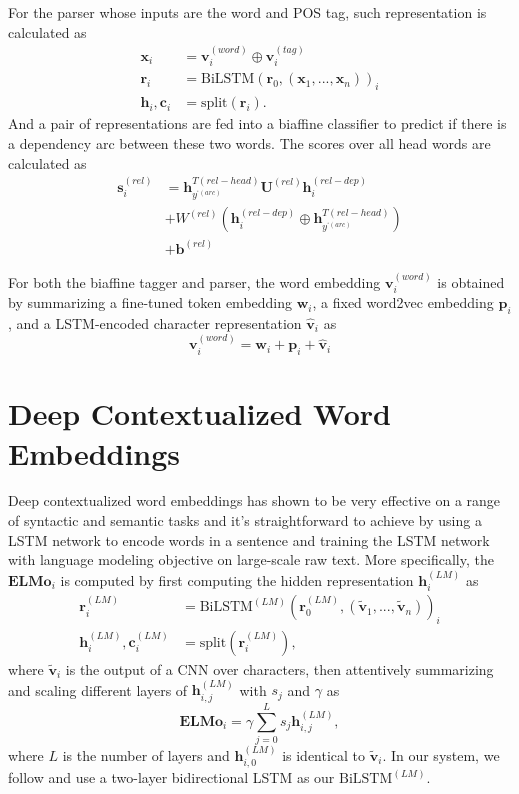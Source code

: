 \documentclass[11pt,a4paper]{article}
\begin{document}
For the parser whose inputs are the word and POS tag,
such representation is calculated as
\begin{align*}
\mathbf{x}_i & =  \mathbf{v}_i^{(word)} \oplus \mathbf{v}_i^{(tag)} \\
\mathbf{r}_i & =  \text{BiLSTM}(\mathbf{r}_0, (\mathbf{x}_1, ..., \mathbf{x}_n))_i \\
\mathbf{h}_i, \mathbf{c}_i & = \text{split}(\mathbf{r}_i)\text{.}
\end{align*}
And a pair of representations are fed into a biaffine classifier
to predict if there is a dependency arc between these two words.
The scores over all head words are calculated as
\begin{align*}
\mathbf{s}_i^{(rel)} & = \mathbf{h}^{T(rel-head)}_{y^{‘(arc)}} \mathbf{U}^{(rel)} \mathbf{h}_i^{(rel-dep)} \\
& + W^{(rel)} (\mathbf{h}_i^{(rel-dep)} \oplus \mathbf{h}^{T(rel-head)}_{y^{‘(arc)}}) \\
& + \mathbf{b}^{(rel)}
\end{align*}

For both the biaffine tagger and parser, 
the word embedding $\mathbf{v}_i^{(word)}$ is obtained by summarizing 
a fine-tuned token embedding $\mathbf{w}_i$, a fixed word2vec embedding $\mathbf{p}_i$, and a LSTM-encoded
character representation $\mathbf{\hat{v}}_i$ as
\[
\mathbf{v}_i^{(word)} = \mathbf{w}_i + \mathbf{p}_i + \mathbf{\hat{v}}_i
\]

\section{Deep Contextualized Word Embeddings}\label{sec:elmo}

Deep contextualized word embeddings \citep[ELMo]{N18-1202}
has shown to
be very effective on a range of syntactic and semantic tasks
and it's straightforward to achieve by
using a LSTM network to encode words in a sentence
and training the LSTM network with language modeling objective
on large-scale raw text.
More specifically, the $\mathbf{ELMo}_i$ is computed
by first computing the hidden representation $\mathbf{h}_i^{(LM)}$ as
\begin{align*}
\mathbf{r}_i^{(LM)} & =  \text{BiLSTM}^{(LM)}(\mathbf{r}_0^{(LM)}, (\mathbf{\tilde{v}}_1, ..., \mathbf{\tilde{v}}_n))_i \\
\mathbf{h}_i^{(LM)}, \mathbf{c}_i^{(LM)} & = \text{split}(\mathbf{r}_i^{(LM)})\text{,}
\end{align*}
where $\mathbf{\tilde{v}}_i$ is the output of a CNN over characters,
then attentively summarizing and scaling different layers of  $\mathbf{h}_{i, j}^{(LM)}$
with $s_j$ and $\gamma$
as
\[
\mathbf{ELMo}_i = \gamma \sum_{j=0}^L s_j \mathbf{h}_{i, j}^{(LM)},
\]
where $L$ is the number of layers and $\mathbf{h}_{i, 0}^{(LM)}$ is identical to $\mathbf{\tilde{v}}_i$.
In our system, we follow \citet{N18-1202} and use a two-layer bidirectional LSTM as our $\text{BiLSTM}^{(LM)}$.
\end{document}
